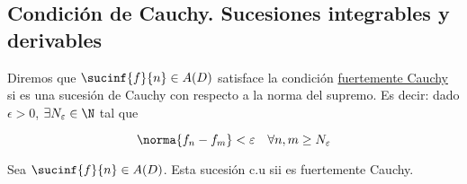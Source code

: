 \subsection{Condición de Cauchy. Sucesiones integrables y derivables}

\begin{nota}
    Diremos que $\sucinf{f}{n} \in A(D)$ satisface la condición \ul{fuertemente Cauchy} si es una sucesión de Cauchy con respecto a la norma del supremo. Es decir: dado $\epsilon > 0$, $\exists N_{\varepsilon} \in \N$ tal que
    
    \[
    \norma{f_n - f_m} < \varepsilon \quad \forall n,m \geq N_{\varepsilon}
    \]
\end{nota}

\begin{teo}
    Sea $\sucinf{f}{n} \in A(D)$. Esta sucesión c.u sii es fuertemente Cauchy.
\end{teo}

